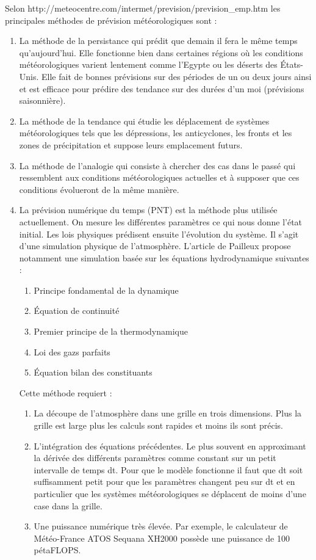 \documentclass[11pt,a4paper]{article}
\begin{document}
Selon http://meteocentre.com/intermet/prevision/prevision\_emp.htm
les principales méthodes de prévision météorologiques sont :
\begin{enumerate}
\item La méthode de la persistance qui prédit que demain il fera le même temps qu'aujourd'hui. Elle fonctionne bien dans certaines régions où les conditions météorologiques varient lentement comme	l'Egypte ou les déserts des États-Unis. Elle fait de bonnes prévisions sur des périodes de un ou deux jours ainsi et est efficace pour prédire des tendance sur des durées d'un moi (prévisions saisonnière). 
\item La méthode de la tendance qui étudie les déplacement de systèmes météorologiques tels que les dépressions, les anticyclones, les fronts et les zones de précipitation et suppose leurs emplacement futurs.
\item La méthode de l'analogie qui consiste à chercher des cas dans le passé qui ressemblent aux conditions météorologiques actuelles et à supposer que ces conditions évolueront de la même manière.
\item La prévision numérique du temps (PNT) est la méthode plus utilisée actuellement. On mesure les différentes paramètres ce qui nous donne l'état initial. Les lois physiques prédisent ensuite l'évolution du système. Il s'agit d'une simulation physique de l'atmosphère. L'article de Pailleux \cite{PAILLEUX}
 propose notamment une simulation basée sur les équations hydrodynamique suivantes : \begin {enumerate}
\item Principe fondamental de la dynamique
\item Équation de continuité
\item Premier principe de la thermodynamique
\item Loi des gazs parfaits
\item Équation bilan des constituants
\end {enumerate}
Cette méthode requiert :
\begin{enumerate} 
\item La découpe de l'atmosphère dans une grille en trois dimensions. Plus la grille est large plus les calculs sont rapides et moins ils sont précis.
\item L'intégration des équations précédentes. Le plus souvent en approximant la dérivée des différents paramètres comme constant sur un petit intervalle de temps dt. Pour que le modèle fonctionne il faut que dt soit suffisamment petit pour que les paramètres changent peu sur dt et en particulier que les systèmes météorologiques se déplacent de moins d'une case dans la grille.
\item Une puissance numérique très élevée. Par exemple, le calculateur de Météo-France ATOS Sequana XH2000 possède une puissance de 100 pétaFLOPS. 
\end {enumerate}
\end{enumerate}
\end{document}
